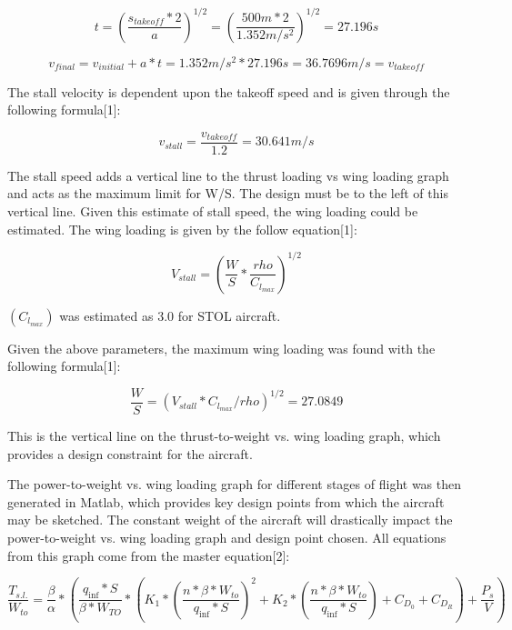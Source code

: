 \documentclass{article}
\begin{document}
\begin{equation}
    t = (\frac{s_{takeoff}*2}{a})^{1/2} = (\frac{500m*2}{1.352m/s^{2}})^{1/2} = 27.196 s
    \label{eq: kinematic time}
\end{equation}

\begin{equation} 
v_{final} = v_{initial} + a*t = 1.352m/s^{2} * 27.196s = 36.7696 m/s = v_{takeoff}
\label{eq: kinematic speed}
\end{equation}

The stall velocity is dependent upon the takeoff speed and is given through the following formula[1]: 

\begin{equation} 
v_{stall} = \frac{v_{takeoff}}{1.2} = 30.641 m/s
\end{equation}

The stall speed adds a vertical line to the thrust loading vs wing loading graph and acts as the maximum limit for W/S. The design must be to the left of this vertical line. 
Given this estimate of stall speed, the wing loading could be estimated. The wing loading is given by the follow equation[1]: 

\begin{equation}
    V_{stall} = (\frac{W}{S}*\frac{rho}{C_{l_{max}}})^{1/2}
\end{equation}

 $({C_{l_{max}}})$ was estimated as 3.0 for STOL aircraft.
 
 Given the above parameters, the maximum wing loading was found with the following formula[1]: 
 
 \begin{equation} 
 \frac{W}{S} = (V_{stall}*C_{l_{max}}/rho)^{1/2} = 27.0849
 \end {equation} 
 
 This is the vertical line on the thrust-to-weight vs. wing loading graph, which provides a design constraint for the aircraft. 
 
 The power-to-weight vs. wing loading graph for different stages of flight was then generated in Matlab, which provides key design points from which the aircraft may be sketched. The constant weight of the aircraft will drastically impact the power-to-weight vs. wing loading graph and design point chosen. All equations from this graph come from the master equation[2]: 
 
 \begin{equation}
     \frac{T_{s.l.}}{W_{to}} = \frac{\beta}{\alpha}* (\frac{q_{\inf}*S}{\beta*W_{TO}}*(K_{1}*(\frac{n*\beta*W_{to}}{q_{\inf}*S})^{2} + K_{2}*(\frac{n*\beta*W_{to}}{q_{\inf}*S}) + C_{D_{0}} + C_{D_{R}}) + \frac{P_{s}}{V})
 \end{equation}
 
\end{document}
